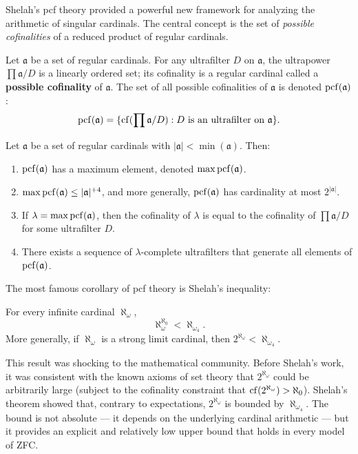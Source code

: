 Shelah's pcf theory provided a powerful new framework for analyzing the arithmetic of singular cardinals. The central concept is the set of \emph{possible cofinalities} of a reduced product of regular cardinals.

\begin{definition}[PCF]
Let \(\mathfrak{a}\) be a set of regular cardinals. For any ultrafilter \(D\) on \(\mathfrak{a}\), the ultrapower \(\prod \mathfrak{a} / D\) is a linearly ordered set; its cofinality is a regular cardinal called a \textbf{possible cofinality} of \(\mathfrak{a}\). The set of all possible cofinalities of \(\mathfrak{a}\) is denoted \(\operatorname{pcf}(\mathfrak{a})\):
\[
\operatorname{pcf}(\mathfrak{a}) = \{\operatorname{cf}(\prod \mathfrak{a} / D) : D \text{ is an ultrafilter on } \mathfrak{a}\}.
\]
\end{definition}

\begin{theorem}
Let \(\mathfrak{a}\) be a set of regular cardinals with \(|\mathfrak{a}| < \min(\mathfrak{a})\). Then:
\begin{enumerate}
    \item \(\operatorname{pcf}(\mathfrak{a})\) has a maximum element, denoted \(\max \operatorname{pcf}(\mathfrak{a})\).
    \item \(\max \operatorname{pcf}(\mathfrak{a}) \leq |\mathfrak{a}|^{+4}\), and more generally, \(\operatorname{pcf}(\mathfrak{a})\) has cardinality at most \(2^{|\mathfrak{a}|}\).
    \item If \(\lambda = \max \operatorname{pcf}(\mathfrak{a})\), then the cofinality of \(\lambda\) is equal to the cofinality of \(\prod \mathfrak{a} / D\) for some ultrafilter \(D\).
    \item There exists a sequence of \(\lambda\)-complete ultrafilters that generate all elements of \(\operatorname{pcf}(\mathfrak{a})\).
\end{enumerate}
\end{theorem}

The most famous corollary of pcf theory is Shelah's inequality:

\begin{theorem}
For every infinite cardinal \(\aleph_\omega\),
\[
\aleph_\omega^{\aleph_0} < \aleph_{\omega_4}.
\]
More generally, if \(\aleph_\omega\) is a strong limit cardinal, then \(2^{\aleph_\omega} < \aleph_{\omega_4}\).
\end{theorem}

This result was shocking to the mathematical community. Before Shelah's work, it was consistent with the known axioms of set theory that \(2^{\aleph_\omega}\) could be arbitrarily large (subject to the cofinality constraint that \(\operatorname{cf}(2^{\aleph_\omega}) > \aleph_0\)). Shelah's theorem showed that, contrary to expectations, \(2^{\aleph_\omega}\) is bounded by \(\aleph_{\omega_4}\). The bound is not absolute --- it depends on the underlying cardinal arithmetic --- but it provides an explicit and relatively low upper bound that holds in every model of ZFC.


